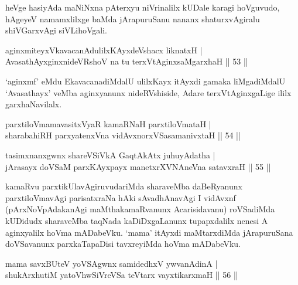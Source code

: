 \begin{artha}
heVge hasiyAda maNiNxna pAterxyu niVrinalilx kUDale karagi hoVguvudo, hAgeyeV namamxlilxge baMda jArapuruSanu nananx shaturxvAgiralu shiVGarxvAgi siVLihoVgali.
\end{artha}


\begin{shl}
aginxmiteyxVkavacanAdulilxKAyxdeVshacx liknatxH | \\
AvasathAyxginxnideVRshoV na tu terxVtAginxsaMgarxhaH \hfill|| 53 || 
\end{shl}

\begin{artha}
`aginxmf' eMdu EkavacanadiMdalU ulilxKayx itAyxdi gamaka liMgadiMdalU `Avasathayx' veMba aginxyanunx nideRVshiside, Adare terxVtAginxgaLige ililx garxhaNavilalx.
\end{artha}


\begin{shl}
parxtiloVmamavasitxVyaR kamaRNaH parxtiloVmataH | \\
sharabahiRH parxyatenxVna vidAvxnorxVSasamanivxtaH \hfill|| 54 || 
\end{shl}

\begin{shl}
tasimxnanxgwnx shareVSiVkA GaqtAkAtx juhuyAdatha | \\
jArasayx doVSaM parxKAyxpayx manetxrXVNAneVna satavxraH \hfill|| 55 || 
\end{shl}

\begin{artha}
kamaRvu parxtikUlavAgiruvudariMda sharaveMba daBeRyanunx parxtiloVmavAgi parisatxraNa hAki sAvadhAnavAgi I vidAvxnf (pArxNoVpAdakanAgi maMthakamaRvanunx Acarisidavanu) roVSadiMda kUDidudx sharaveMba taqNada kaDiDxgaLanunx tupapxdalilx nenesi A aginxyalilx hoVma mADabeVku. `mama' itAyxdi maMtarxdiMda jArapuruSana doVSavanunx parxkaTapaDisi tavxreyiMda hoVma mADabeVku.
\end{artha}


\begin{shl}
mama savxBUteV yoVSAgwnx samidedhxV ywvanAdinA | \\
shukArxhutiM yatoV\s hwSiVreVSa teV\s tarx vayxtikarxmaH \hfill|| 56 || 
\end{shl}

